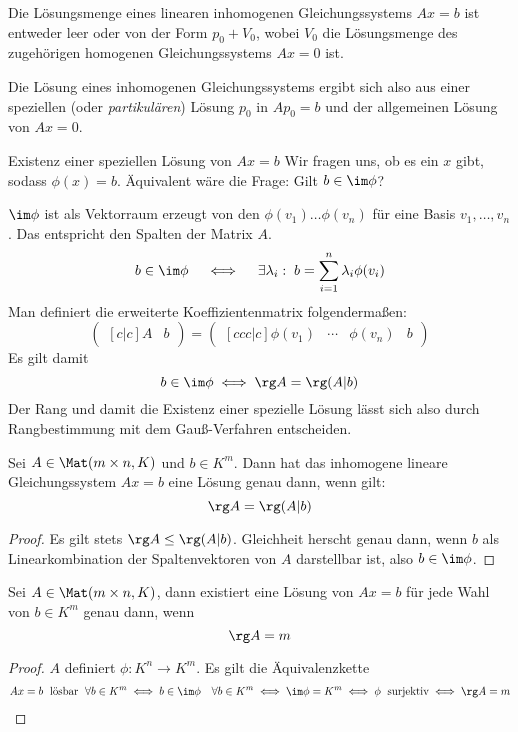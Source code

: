 \documentclass{mycourse}
\begin{document}
Die Lösungsmenge eines linearen inhomogenen Gleichungssystems $Ax=b$ ist entweder leer oder von der Form $p_0+V_0$, wobei $V_0$ die Lösungsmenge des zugehörigen homogenen Gleichungssystems $Ax=0$ ist.

Die Lösung eines inhomogenen Gleichungssystems ergibt sich also aus einer speziellen (oder \emph{partikulären}) Lösung $p_0$ in $Ap_0 = b$ und der allgemeinen Lösung von $Ax=0$.

\begin{seg}{Existenz einer speziellen Lösung von $Ax=b$}
	Wir fragen uns, ob es ein $x$ gibt, sodass $\phi(x) = b$.
	Äquivalent wäre die Frage: Gilt $b\in\im\phi$?

	$\im\phi$ ist als Vektorraum erzeugt von den $\phi(v_1)\dotsc\phi(v_n)$ für eine Basis $v_1,\dotsc,v_n$.
	Das entspricht den Spalten der Matrix $A$.
\[
b\in\im\phi \quad \iff\quad \exists \lambda_i:\;b=\sum_{i=1}^n\lambda_i\phi(v_i)
\]
Man definiert die erweiterte Koeffizientenmatrix folgendermaßen:
\[
	\begin{pmatrix}[c|c] A&b\end{pmatrix}=\begin{pmatrix}[ccc|c]\phi(v_1)&\cdots&\phi(v_n)&b\end{pmatrix}
\]
Es gilt damit
\[
b\in\im\phi \iff \rg A = \rg(A|b)
\]
Der Rang und damit die Existenz einer spezielle Lösung lässt sich also durch Rangbestimmung mit dem Gauß-Verfahren entscheiden.
\end{seg}
\begin{thm} \label{thm:8.13}
Sei $A \in \Mat(m\times n,K)$ und $b\in K^m$. Dann hat das inhomogene lineare Gleichungssystem $Ax=b$ eine Lösung genau dann, wenn gilt:
\[
\rg A=\rg(A|b)
\]
\begin{proof}
	Es gilt stets $\rg A \le \rg(A|b)$.
	Gleichheit herscht genau dann, wenn $b$ als Linearkombination der Spaltenvektoren von $A$ darstellbar ist, also $b\in \im \phi$.
\end{proof}
\end{thm}

\begin{kor}
	\label{kor:8.14}
	Sei $A\in \Mat(m\times n, K)$, dann existiert eine Lösung von $Ax=b$ für jede Wahl von $b\in K^m$ genau dann, wenn
	\[
		\rg A = m
	\]
\begin{proof}
$A$ definiert $\phi:K^n\to K^m$.
Es gilt die Äquivalenzkette
\begin{align*}
Ax=b \; \text{ lösbar $\;\forall b\in K^m$} 
	\iff b\in\im\phi \quad \forall b\in K^m
	\iff \im \phi = K^m
	\iff \phi\; \text{ surjektiv} 
	\iff \rg A =m
\end{align*}
\end{proof}
\end{kor}
\end{document}
